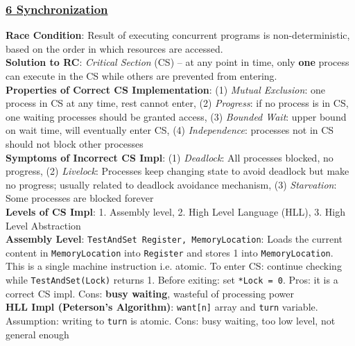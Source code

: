 \documentclass{article}
\begin{document}
\begin{multicols*}{3}
\subsubsection*{\underline{6 Synchronization}}
\textbf{Race Condition}: Result of executing concurrent programs is non-deterministic, based on the order in which resources are accessed. \\
\textbf{Solution to RC}: \textit{Critical Section} (CS) – at any point in time, only \textbf{one} process can execute in the CS while others are prevented from entering.\\
\textbf{Properties of Correct CS Implementation}: (1) \textit{Mutual Exclusion}: one process in CS at any time, rest cannot enter, (2) \textit{Progress}: if no process is in CS, one waiting processes should be granted access, (3) \textit{Bounded Wait}: upper bound on wait time, will eventually enter CS, (4) \textit{Independence}: processes not in CS should not block other processes \\
\textbf{Symptoms of Incorrect CS Impl}: (1) \textit{Deadlock}: All processes blocked, no progress, (2) \textit{Livelock}: Processes keep changing state to avoid deadlock but make no progress; usually related to deadlock avoidance mechanism, (3) \textit{Starvation}: Some processes are blocked forever \\
\textbf{Levels of CS Impl}: 1. Assembly level, 2. High Level Language (HLL), 3. High Level Abstraction \\
\textbf{Assembly Level}: \texttt{TestAndSet Register, MemoryLocation}: Loads the current content in \texttt{MemoryLocation} into \texttt{Register} and stores 1 into \texttt{MemoryLocation}. This is a single machine instruction i.e. atomic. To enter CS: continue checking while \texttt{TestAndSet(Lock)} returns 1. Before exiting: set \texttt{*Lock = 0}. Pros: it is a correct CS impl. Cons: \textbf{busy waiting}, wasteful of processing power \\
\textbf{HLL Impl (Peterson's Algorithm)}: \texttt{want[n]} array and \texttt{turn} variable. Assumption: writing to \texttt{turn} is atomic. Cons: busy waiting, too low level, not general enough \\


\end{multicols*}
\end{document}
